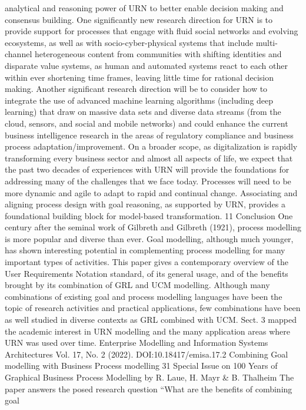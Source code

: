 analytical and reasoning power of URN to better
enable decision making and consensus building.
One significantly new research direction for
URN is to provide support for processes that
engage with fluid social networks and evolving
ecosystems, as well as with socio-cyber-physical
systems that include multi-channel heterogeneous
content from communities with shifting identities
and disparate value systems, as human and automated systems react to each other within ever
shortening time frames, leaving little time for
rational decision making.
Another significant research direction will be to
consider how to integrate the use of advanced machine learning algorithms (including deep learning) that draw on massive data sets and diverse
data streams (from the cloud, sensors, and social
and mobile networks) and could enhance the current business intelligence research in the areas
of regulatory compliance and business process
adaptation/improvement.
On a broader scope, as digitalization is rapidly
transforming every business sector and almost
all aspects of life, we expect that the past two
decades of experiences with URN will provide
the foundations for addressing many of the challenges that we face today. Processes will need
to be more dynamic and agile to adapt to rapid
and continual change. Associating and aligning
process design with goal reasoning, as supported
by URN, provides a foundational building block
for model-based transformation.
11 Conclusion
One century after the seminal work of Gilbreth
and Gilbreth (1921), process modelling is more
popular and diverse than ever. Goal modelling,
although much younger, has shown interesting
potential in complementing process modelling for
many important types of activities.
This paper gives a contemporary overview of
the User Requirements Notation standard, of its
general usage, and of the benefits brought by
its combination of GRL and UCM modelling.
Although many combinations of existing goal and
process modelling languages have been the topic
of research activities and practical applications,
few combinations have been as well studied in
diverse contexts as GRL combined with UCM.
Sect. 3 mapped the academic interest in URN
modelling and the many application areas where
URN was used over time.
Enterprise Modelling and Information Systems Architectures
Vol. 17, No. 2 (2022). DOI:10.18417/emisa.17.2
Combining Goal modelling with Business Process modelling 31
Special Issue on 100 Years of Graphical Business Process Modelling by R. Laue, H. Mayr & B. Thalheim
The paper answers the posed research question “What are the benefits of combining goal
